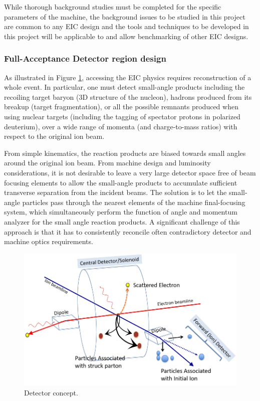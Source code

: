 While thorough background studies must be completed for the specific parameters of the machine, the background issues to be studied in this project are common to any EIC design and the tools and techniques to be developed in this project will be applicable to and allow benchmarking of other EIC designs.

\subsubsection{Full-Acceptance Detector region design}

As illustrated in Figure \ref{fig:detector_concept}, accessing the EIC physics requires reconstruction of a whole event. In particular, one must detect small-angle products including the recoiling target baryon (3D structure of the nucleon), hadrons produced from its breakup (target fragmentation), or all the possible remnants produced when using nuclear targets (including the tagging of spectator protons in polarized deuterium), over a wide range of momenta (and charge-to-mass ratios) with respect to the original ion beam.

From simple kinematics, the reaction products are biased towards small angles around the original ion beam. From machine design and luminosity considerations, it is not desirable to leave a very large detector space free of beam focusing elements to allow the small-angle products to accumulate sufficient transverse separation from the incident beams. The solution is to let the small-angle particles pass through the nearest elements of the machine final-focusing system, which simultaneously perform the function of angle and momentum analyzer for the small angle reaction products. A significant challenge of this approach is that it has to consistently reconcile often contradictory detector and machine optics requirements.

\begin{figure}[!htb]
	\centering
	\includegraphics[width=.75\textwidth]{../../img/central_detector.png}
	\caption{Detector concept.}
	\label{fig:detector_concept}
\end{figure}

